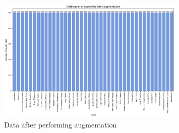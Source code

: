 \begin{figure}[h!]
    \centering
    \includegraphics[width=0.8\textwidth]{images/after_augmentation.png}
    \caption{Data after performing augmentation}
    \label{fig:visualization}
\end{figure}



\newpage






